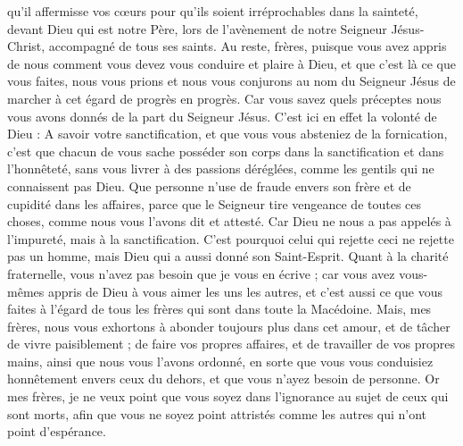 \begin{multicols}{2}
qu’il affermisse vos cœurs pour qu’ils soient irréprochables dans la sainteté, devant Dieu qui est notre Père, lors de l’avènement de notre Seigneur Jésus-Christ, accompagné de tous ses saints.
\VerseOne{}Au reste, frères, puisque vous avez appris de nous comment vous devez vous conduire et plaire à Dieu, et que c’est là ce que vous faites, nous vous prions et nous vous conjurons au nom du Seigneur Jésus de marcher à cet égard de progrès en progrès.
Car vous savez quels préceptes nous vous avons donnés de la part du Seigneur Jésus.
C’est ici en effet la volonté de Dieu : A savoir votre sanctification, et que vous vous absteniez de la fornication,
c’est que chacun de vous sache posséder son corps dans la sanctification et dans l’honnêteté,
sans vous livrer à des passions déréglées, comme les gentils qui ne connaissent pas Dieu.
Que personne n’use de fraude envers son frère et de cupidité dans les affaires, parce que le Seigneur tire vengeance de toutes ces choses, comme nous vous l’avons dit et attesté.
Car Dieu ne nous a pas appelés à l’impureté, mais à la sanctification.
C'est pourquoi celui qui rejette ceci ne rejette pas un homme, mais Dieu qui a aussi donné son Saint-Esprit.
Quant à la charité fraternelle, vous n'avez pas besoin que je vous en écrive ; car vous avez vous-mêmes appris de Dieu à vous aimer les uns les autres,
et c'est aussi ce que vous faites à l'égard de tous les frères qui sont dans toute la Macédoine. Mais, mes frères, nous vous exhortons à abonder toujours plus dans cet amour,
et de tâcher de vivre paisiblement ; de faire vos propres affaires, et de travailler de vos propres mains, ainsi que nous vous l'avons ordonné,
en sorte que vous vous conduisiez honnêtement envers ceux du dehors, et que vous n'ayez besoin de personne.
Or mes frères, je ne veux point que vous soyez dans l’ignorance au sujet de ceux qui sont morts, afin que vous ne soyez point attristés comme les autres qui n'ont point d'espérance.

\end{multicols}
